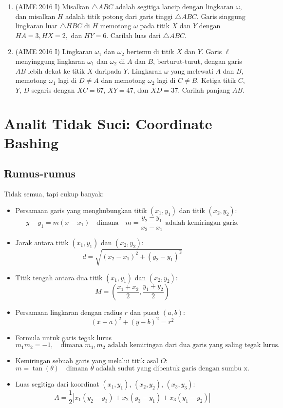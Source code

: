 \documentclass[12pt]{scrartcl}
\begin{document}
\begin{enumerate}
    \item (AIME 2016 I) Misalkan $\triangle ABC$ adalah segitiga lancip dengan lingkaran $\omega,$ dan misalkan $H$ adalah titik potong dari garis tinggi $\triangle ABC.$ Garis singgung lingkaran luar $\triangle HBC$ di $H$ memotong $\omega$ pada titik $X$ dan $Y$ dengan $HA=3,HX=2,$ dan $HY=6.$ Carilah luas dari $\triangle ABC$.

    \item (AIME 2016 I) Lingkaran $\omega_1$ dan $\omega_2$ bertemu di titik $X$ dan $Y$. Garis $\ell$ menyinggung lingkaran $\omega_1$ dan $\omega_2$ di $A$ dan $B$, berturut-turut, dengan garis $AB$ lebih dekat ke titik $X$ daripada $Y$. Lingkaran $\omega$ yang melewati $A$ dan $B$, memotong $\omega_1$ lagi di $D \neq A$ dan memotong $\omega_2$ lagi di $C \neq B$. Ketiga titik $C$, $Y$, $D$ segaris dengan $XC = 67$, $XY = 47$, dan $XD = 37$. Carilah panjang $AB$.
\end{enumerate}


\newpage
\section{Analit Tidak Suci: Coordinate Bashing}
\subsection{Rumus-rumus}
Tidak semua, tapi cukup banyak:
\begin{itemize}
    \item Persamaan garis yang menghubungkan titik $(x_1, y_1)$ dan titik $(x_2, y_2)$:
    \[ y - y_1 = m(x - x_1) \quad \text{dimana} \quad m = \frac{y_2 - y_1}{x_2 - x_1} \text{ adalah kemiringan garis.} \]
    
    \item Jarak antara titik $(x_1, y_1)$ dan $(x_2, y_2)$:
    \[ d = \sqrt{(x_2 - x_1)^2 + (y_2 - y_1)^2} \]
    
    \item Titik tengah antara dua titik $(x_1, y_1)$ dan $(x_2, y_2)$:
    \[ M = \left(\frac{x_1 + x_2}{2}, \frac{y_1 + y_2}{2}\right) \]
    
    \item Persamaan lingkaran dengan radius $r$ dan pusat $(a, b)$:
    \[ (x - a)^2 + (y - b)^2 = r^2 \]
    
    \item Formula untuk garis tegak lurus
    \[ m_1m_2 = -1, \quad \text{dimana } m_1, m_2 \text{ adalah kemiringan dari dua garis yang saling tegak lurus.} \]
    
    \item Kemiringan sebuah garis yang melalui titik asal $O$:
    \[ m = \tan(\theta) \quad \text{dimana } \theta \text{ adalah sudut yang dibentuk garis dengan sumbu x.} \]
    
    \item Luas segitiga dari koordinat $(x_1, y_1)$, $(x_2, y_2)$, $(x_3, y_3)$:
    \[ A = \frac{1}{2} 
    \left| 
    x_1(y_2 - y_3) + x_2(y_3 - y_1) + x_3(y_1 - y_2) 
    \right| \]
\end{itemize}
\end{document}
